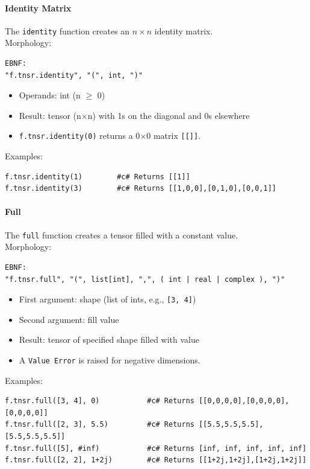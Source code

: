 \paragraph{Identity Matrix}
The \texttt{identity} function creates an $n \times n$ identity matrix.\\
Morphology:
\begin{verbatim}
EBNF:
"f.tnsr.identity", "(", int, ")"
\end{verbatim}
\begin{itemize}
\item Operands: int (n $\geq$ 0)
\item Result: tensor (n$\times$n) with 1s on the diagonal and 0s elsewhere
\item \texttt{f.tnsr.identity(0)} returns a 0$\times$0 matrix \texttt{[[]]}.
\end{itemize}
Examples:
\begin{verbatim}
f.tnsr.identity(1)        #c# Returns [[1]]
f.tnsr.identity(3)        #c# Returns [[1,0,0],[0,1,0],[0,0,1]]
\end{verbatim}

\paragraph{Full}
The \texttt{full} function creates a tensor filled with a constant value.\\
Morphology:
\begin{verbatim}
EBNF:
"f.tnsr.full", "(", list[int], ",", ( int | real | complex ), ")"
\end{verbatim}
\begin{itemize}
\item First argument: shape (list of ints, e.g., \texttt{[3, 4]})
\item Second argument: fill value
\item Result: tensor of specified shape filled with value
\item A \texttt{Value Error} is raised for negative dimensions.
\end{itemize}
Examples:
\begin{verbatim}
f.tnsr.full([3, 4], 0)           #c# Returns [[0,0,0,0],[0,0,0,0],[0,0,0,0]]
f.tnsr.full([2, 3], 5.5)         #c# Returns [[5.5,5.5,5.5],[5.5,5.5,5.5]]
f.tnsr.full([5], #inf)           #c# Returns [inf, inf, inf, inf, inf]
f.tnsr.full([2, 2], 1+2j)        #c# Returns [[1+2j,1+2j],[1+2j,1+2j]]
\end{verbatim}

